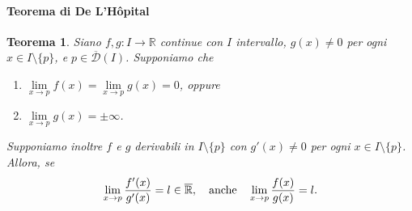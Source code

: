 \documentclass{article}
\theoremstyle{plain}
\newtheorem{thm}{Teorema}[section]
\theoremstyle{definition}
\theoremstyle{remark}
\begin{document}
\paragraph{Teorema di De L'Hôpital}
\begin{bxthm}
\begin{thm}
    Siano $f,g:I\to\mathbb{R}$ continue con $I$ intervallo, $g(x)\neq 0$ per ogni $x\in I\setminus\{p\}$, e $p\in\overline{\mathcal{D}}(I)$.
    Supponiamo che 
    \begin{enumerate}
        \item $\lim\limits_{x\to p}f(x)=\lim\limits_{x\to p}g(x)=0$, oppure 
        \item $\lim\limits_{x\to p}g(x)=\pm\infty$.
    \end{enumerate}
    Supponiamo inoltre $f$ e $g$ derivabili in $I\setminus\{p\}$ con $g'(x)\neq0$ per ogni $x\in I\setminus\{p\}$.    
    Allora, se 
    \[\lim_{x\to p}\dfrac{f'(x)}{g'(x)}=l\in\overline{\mathbb{R}},\quad\textup{anche}\quad \lim_{x\to p}\dfrac{f(x)}{g(x)}=l. \]
\end{thm}
\end{bxthm}
\end{document}
